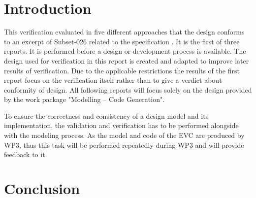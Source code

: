 \documentclass{template/openetcs_article}
\begin{document}



\section{Introduction}
This verification evaluated in five different approaches that the design conforms to an excerpt of Subset-026 \cite{unisig_subset-026_2012}  related to the specification \cite{tsi-2012-88-eu} \cite{tsi-2012-696-eu}.  It is the first of three reports. It is performed before a design or development process is available. The design used for verification in this report is created and adapted to improve later results of verification. Due to the applicable restrictions the results of the first report focus on the verification itself rather than to give a verdict about conformity of design. All following reports will focus solely on the design provided by the work package "Modelling – Code Generation".

To ensure the correctness and consistency of a design model and its implementation, the
validation and verification has to be performed alongside with the modeling process. 
As the model and code of the EVC are produced by WP3,
thus this task will be performed repeatedly during WP3 and will provide
feedback to it.


\newpage



\section{Conclusion}
\label{sec:conclusion}



%



%
\end{document}
